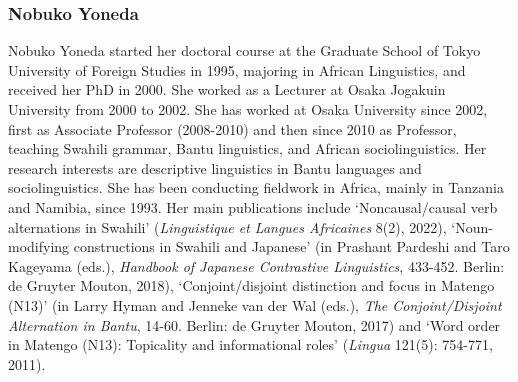 \subsubsection*{Nobuko Yoneda}
Nobuko Yoneda started her doctoral course at the Graduate School of Tokyo University of Foreign Studies in 1995, majoring in African Linguistics, and received her PhD in 2000. She worked as a Lecturer at Osaka Jogakuin  {University from 2000} to 2002. She has worked at Osaka University since 2002, first as Associate  {Professor (2008}-2010) and then since 2010 as Professor, teaching Swahili grammar, Bantu linguistics, and African sociolinguistics. Her research interests are descriptive linguistics in Bantu languages and sociolinguistics. She has been conducting fieldwork in Africa, mainly in Tanzania and Namibia, since 1993. Her main publications include ‘Noncausal/causal verb alternations in Swahili’ (\textit{Linguistique et Langues Africaines} 8(2), 2022), ‘Noun-modifying constructions in Swahili and Japanese’ (in Prashant Pardeshi and Taro Kageyama (eds.), \textit{Handbook of Japanese Contrastive Linguistics}, 433-452. Berlin: de Gruyter Mouton, 2018), ‘Conjoint/disjoint distinction and focus in Matengo (N13)’ (in Larry Hyman and Jenneke van der Wal (eds.), \textit{The Conjoint/Disjoint Alternation in Bantu}, 14-60. Berlin: de Gruyter Mouton, 2017) and ‘Word order in Matengo (N13): Topicality and informational roles’ (\textit{Lingua} 121(5): 754-771, 2011).
